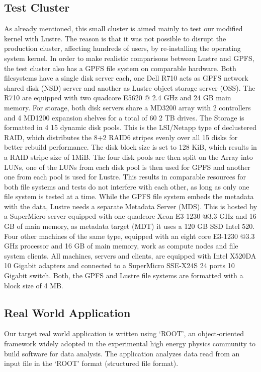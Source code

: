 \subsection{Test Cluster}
\label{subsec: test_cluster}
As already mentioned, this small cluster is aimed mainly to test our modified kernel with Lustre. The reason is that it was not possible to disrupt the production cluster, affecting hundreds of users, by re-installing the operating system kernel. In order 
to make realistic comparisons between Lustre and GPFS, the test cluster also has a GPFS file system on comparable hardware. Both filesystems have a single disk server each, one Dell R710 acts as GPFS network shared disk (NSD) server and another as Lustre 
object storage server (OSS). The R710 are equipped with two quadcore E5620 @ 2.4 GHz and 24 GB main memory. For storage, both disk servers share a MD3200 array with 2 controllers and 4 MD1200 expansion shelves for a total of 60 2 TB drives. The Storage is 
formatted in 4 15 dynamic disk pools. This is the LSI/Netapp type of declustered RAID, which distributes the 8+2 RAID6 stripes evenly over all 15 disks for better rebuild performance. The disk block size is set to 128 KiB, which results in a RAID stripe size 
of 1MiB. The four disk pools are then split on the Array into LUNs, one of the LUNs from each disk pool is then used for GPFS and another one from each pool is used for Lustre. This results in comparable resources for both file systems and tests do not interfere 
with each other, as long as only one file system is tested at a time. While the GPFS file system embeds the metadata with the data, Lustre needs a separate Metadata Server (MDS). This is hosted by a SuperMicro server equipped with one quadcore Xeon E3-1230 
@3.3 GHz and 16 GB of main memory, as metadata target (MDT) it uses a 120 GB SSD Intel 520. Four other machines of the same type, equipped with an eight core E3-1230 @3.3 GHz processor and 16 GB of main memory, work as compute nodes and file system clients. 
All machines, servers and clients, are equipped with Intel X520DA 10 Gigabit adapters and connected to a SuperMicro SSE-X24S 24 ports 10 Gigabit switch. Both, the GPFS and Lustre file systems are formatted with a block size of 4 MB.

\subsection{Real World Application}
\label{subsec: application}
Our target real world application is written using `ROOT', an object-oriented framework widely adopted in the experimental high energy physics community to build software for data analysis. The application analyzes data read from an input file in the `ROOT' 
format (structured file format). 

